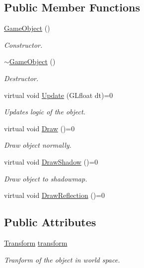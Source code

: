 \subsection*{Public Member Functions}
\begin{DoxyCompactItemize}
\item 
\mbox{\hyperlink{class_game_object_a0348e3ee2e83d56eafca7a3547f432c4}{Game\+Object}} ()
\begin{DoxyCompactList}\small\item\em Constructor. \end{DoxyCompactList}\item 
\mbox{\hyperlink{class_game_object_ab82dfdb656f9051c0587e6593b2dda97}{$\sim$\+Game\+Object}} ()
\begin{DoxyCompactList}\small\item\em Destructor. \end{DoxyCompactList}\item 
virtual void \mbox{\hyperlink{class_game_object_aa100c768006aca3e7cdbabe27b48b9e5}{Update}} (G\+Lfloat dt)=0
\begin{DoxyCompactList}\small\item\em Updates logic of the object. \end{DoxyCompactList}\item 
virtual void \mbox{\hyperlink{class_game_object_a29a665f46fda87982825bc5c0ca6a888}{Draw}} ()=0
\begin{DoxyCompactList}\small\item\em Draw object normally. \end{DoxyCompactList}\item 
virtual void \mbox{\hyperlink{class_game_object_a78bf45c8ef3805247435583556087788}{Draw\+Shadow}} ()=0
\begin{DoxyCompactList}\small\item\em Draw object to shadowmap. \end{DoxyCompactList}\item 
virtual void \mbox{\hyperlink{class_game_object_ad28240509bb63e4fde243e842898cf30}{Draw\+Reflection}} ()=0
\end{DoxyCompactItemize}
\subsection*{Public Attributes}
\begin{DoxyCompactItemize}
\item 
\mbox{\hyperlink{class_transform}{Transform}} \mbox{\hyperlink{class_game_object_ad2de7705e8d1d7b5d0014448dd13f99a}{transform}}
\begin{DoxyCompactList}\small\item\em Tranform of the object in world space. \end{DoxyCompactList}\end{DoxyCompactItemize}


